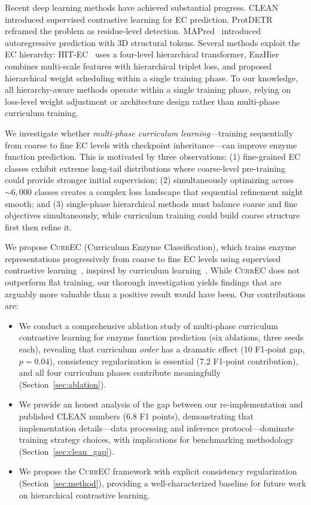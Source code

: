\documentclass{article}
\newcommand{\currec}{\textsc{CurrEC}}
\begin{document}
Recent deep learning methods have achieved substantial progress. CLEAN~\citep{yu2023enzyme} introduced supervised contrastive learning for EC prediction. ProtDETR~\citep{yang2025interpretable} reframed the problem as residue-level detection. MAPred~\citep{rong2025autoregressive} introduced autoregressive prediction with 3D structural tokens. Several methods exploit the EC hierarchy: HIT-EC~\citep{dumontet2026trustworthy} uses a four-level hierarchical transformer, EnzHier~\citep{duan2026enzhier} combines multi-scale features with hierarchical triplet loss, and \citet{yim2024hierarchical} proposed hierarchical weight scheduling within a single training phase. To our knowledge, all hierarchy-aware methods operate within a single training phase, relying on loss-level weight adjustment or architecture design rather than multi-phase curriculum training.

We investigate whether \emph{multi-phase curriculum learning}---training sequentially from coarse to fine EC levels with checkpoint inheritance---can improve enzyme function prediction. This is motivated by three observations: (1) fine-grained EC classes exhibit extreme long-tail distributions where coarse-level pre-training could provide stronger initial supervision; (2) simultaneously optimizing across ${\sim}6{,}000$ classes creates a complex loss landscape that sequential refinement might smooth; and (3) single-phase hierarchical methods must balance coarse and fine objectives simultaneously, while curriculum training could build coarse structure first then refine it.

We propose \currec{} (Curriculum Enzyme Classification), which trains enzyme representations progressively from coarse to fine EC levels using supervised contrastive learning~\citep{khosla2020supervised}, inspired by curriculum learning~\citep{bengio2009curriculum}. While \currec{} does not outperform flat training, our thorough investigation yields findings that are arguably more valuable than a positive result would have been. Our contributions are:
\begin{itemize}
    \item We conduct a comprehensive ablation study of multi-phase curriculum contrastive learning for enzyme function prediction (six ablations, three seeds each), revealing that curriculum \emph{order} has a dramatic effect (10 F1-point gap, $p=0.04$), consistency regularization is essential (7.2 F1-point contribution), and all four curriculum phases contribute meaningfully (Section~\ref{sec:ablation}).
    \item We provide an honest analysis of the gap between our re-implementation and published CLEAN numbers (6.8 F1 points), demonstrating that implementation details---data processing and inference protocol---dominate training strategy choices, with implications for benchmarking methodology (Section~\ref{sec:clean_gap}).
    \item We propose the \currec{} framework with explicit consistency regularization (Section~\ref{sec:method}), providing a well-characterized baseline for future work on hierarchical contrastive learning.
\end{itemize}
\end{document}
